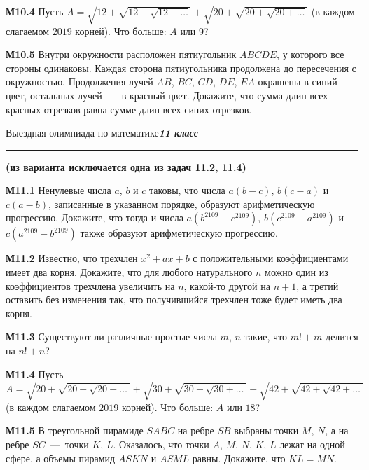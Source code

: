 \documentclass[12pt, a4paper, usenames]{article}
\begin{document}
\bigskip

{\bf М10.4} Пусть $A = \sqrt{12+\sqrt{12+\sqrt{12+\dotsc}}} + \sqrt{20+\sqrt{20+\sqrt{20+\dotsc}}}$ (в каждом слагаемом $2019$ корней). Что больше: $A$ или $9$?

\bigskip

{\bf М10.5} Внутри окружности расположен пятиугольник $ABCDE$, у которого все стороны одинаковы. Каждая сторона пятиугольника продолжена до пересечения с окружностью. Продолжения лучей $AB$, $BC$, $CD$, $DE$, $EA$ окрашены в синий цвет, остальных лучей~---~в красный цвет. Докажите, что сумма длин всех красных отрезков равна сумме длин всех синих отрезков.

\bigskip

\newpage
\begin{center}
Выездная олимпиада по математике\hfill\textit{\bf 11 класс}
\hrule\medskip
{\bf (из варианта исключается одна из задач 11.2, 11.4)}
\end{center}

{\bf М11.1} Ненулевые числа $a$, $b$ и $c$ таковы, что числа $a(b-c)$, $b(c-a)$ и $c(a-b)$, записанные в указанном порядке, образуют арифметическую прогрессию. Докажите, что тогда и числа $a(b^{2109}-c^{2109})$, $b(c^{2109}-a^{2109})$ и $c(a^{2109}-b^{2109})$ также образуют арифметическую прогрессию. 

\bigskip

{\bf М11.2} Известно, что трехчлен $x^2+ax+b$ с положительными коэффициентами имеет два корня. Докажите, что для любого натурального $n$ можно один из коэффициентов трехчлена увеличить на $n$, какой-то другой на $n+1$, а третий оставить без изменения так, что получившийся трехчлен тоже будет иметь два корня.

\bigskip

{\bf М11.3} Существуют ли различные простые числа $m$, $n$ такие, что $m!+m$ делится на $n!+n$?

\bigskip

{\bf М11.4} Пусть $A = \sqrt{20+\sqrt{20+\sqrt{20+\dotsc}}} + \sqrt{30+\sqrt{30+\sqrt{30+\dotsc}}} + \sqrt{42+\sqrt{42+\sqrt{42+\dotsc}}}$ (в каждом слагаемом $2019$ корней). Что больше: $A$ или $18$?

\bigskip

{\bf М11.5} В треугольной пирамиде $SABC$ на ребре $SB$ выбраны точки $M$, $N$, а на ребре $SC$~---~точки $K$, $L$. Оказалось, что точки $A$, $M$, $N$, $K$, $L$ лежат на одной сфере, а объемы пирамид $ASKN$ и $ASML$ равны. Докажите, что $KL = MN$.
\end{document}
